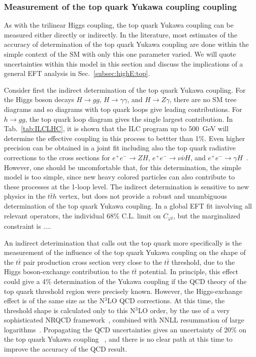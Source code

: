 \subsubsection{Measurement of the top quark Yukawa coupling coupling}
\label{subsec:top:topYukawa}


As with the trilinear Higgs coupling, the top quark Yukawa coupling can be
measured either directly or indirectly.  In the literature, most
estimates of the accuracy of determination of the top quark Yukawa
coupling are done within the simple context of the SM with only this
one parameter varied.   We will quote uncertainties
within
this model in this section and discuss the implications of a general 
EFT analysis in Sec.~\ref{subsec:highE:top}.

Consider first the indirect determination of the top quark Yukawa coupling.
   For the Higgs boson decays
$H\to gg$, $H\to \gamma\gamma$, and $H\to Z \gamma$, there are no SM tree
diagrams
and so diagrams with top quark loops give leading contributions.  For
$h\to gg$, the top quark loop diagram gives the single largest
contribution.   In Tab.~\ref{tab:ILCLHC}, it is shown that the ILC
program up to 
500~GeV will determine the effective coupling in this process to bettter
than 1\%. Even higher precision can be obtained in a joint fit
including also the top quark radiative corrections to the cross
sections for $e^+e^- \rightarrow ZH$, $e^+e^- \rightarrow \nu\bar\nu
H$, and $e^+e^- \to  \gamma H$~\cite{Boselli:2018zxr}. However, one
should be uncomfortable that, for this determination, the simple model is
too simple, since new heavy colored particles can also contribute to
these processes at the 1-loop level. The indirect determination is 
sensitive to new physics in the $t\bar{t}h$ vertex, but does not provide 
a robust and unambiguous determination of the top quark Yukawa coupling. 
In a global EFT fit involving all relevant operators, the individual 68\% 
C.L. limit on $C_{\varphi t}$, but the marginalized constraint is ....

An indirect deterimination that calls out the top quark more
specifically is the measurement of the influence of the top quark
Yukawa coupling on the shape of the  $t\bar{t}$ pair production 
cross section very close to the $t\bar{t}$ threshold, due to the Higgs
boson-exchange contribution to the $t\bar t$ potential. In principle,
this effect could give a 4\% determination of the Yukawa coupling if
the QCD  theory of the top quark threshold region were precisely
known.   However, the Higgs-exchange effect is of the same size as
the N$^3$LO QCD corrections.  At this time, the threshold shape is
calculated only to this N$^3$LO order, by the use of a very sophisticated
NRQCD framework~\cite{Beneke:2015kwa}, combined with NNLL resummation of
large logarithms~\cite{Hoang:2013uda}.   Propagating the QCD
uncertainties gives an uncertainty of 20\% on the top quark Yukawa
coupling~\cite{Vos:2016til} , and there is no clear path at this time to improve the
accuracy of the QCD result.

